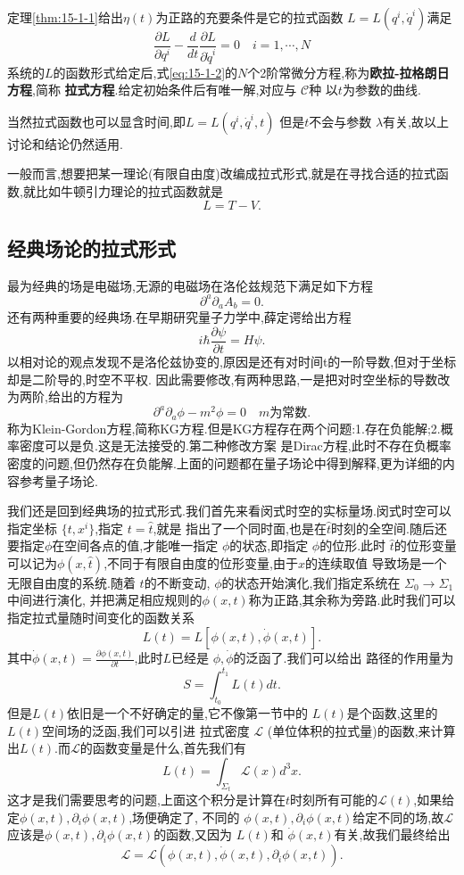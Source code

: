 \documentclass[../main.tex]{subfiles}
\begin{document}
定理\ref{thm:15-1-1}给出$\eta(t)$为正路的充要条件是它的拉式函数 $L = L(q^i,\dot{q}^i)$满足 
\begin{equation}
  \frac{\partial L}{ \partial q^i}  - \frac{d}{dt} \frac{\partial L}{\partial \dot{q}^i} = 0 \quad i = 1, \cdots , N
  \label{eq:15-1-2} 
\end{equation}
系统的$L$的函数形式给定后,式\ref{eq:15-1-2}的$N$个2阶常微分方程,称为\textbf{欧拉-拉格朗日方程},简称 \textbf{拉式方程}.给定初始条件后有唯一解,对应与 $\mathscr{C}$种
以$t$为参数的曲线.

当然拉式函数也可以显含时间,即$L= L(q^i,\dot{q}^i,t) $ 但是$t$不会与参数 $\lambda$有关,故以上讨论和结论仍然适用.

一般而言,想要把某一理论(有限自由度)改编成拉式形式,就是在寻找合适的拉式函数,就比如牛顿引力理论的拉式函数就是\[
L = T - V
.\] 
\subsection{经典场论的拉式形式}
最为经典的场是电磁场,无源的电磁场在洛伦兹规范下满足如下方程\[
\partial^a\partial_a A_b = 0
.\] 
还有两种重要的经典场.在早期研究量子力学中,薛定谔给出方程\[
i\hbar \frac{\partial \psi}{\partial t} = H \psi
.\] 
以相对论的观点发现不是洛伦兹协变的,原因是还有对时间t的一阶导数,但对于坐标却是二阶导的,时空不平权.
因此需要修改,有两种思路,一是把对时空坐标的导数改为两阶,给出的方程为\[
\partial^a\partial_a \phi - m^2 \phi = 0 \quad m\text{为常数}
.\] 
称为Klein-Gordon方程,简称KG方程.但是KG方程存在两个问题:1.存在负能解;2.概率密度可以是负.这是无法接受的.第二种修改方案
是Dirac方程,此时不存在负概率密度的问题,但仍然存在负能解.上面的问题都在量子场论中得到解释,更为详细的内容参考量子场论.

我们还是回到经典场的拉式形式.我们首先来看闵式时空的实标量场.闵式时空可以指定坐标 $\{t,x^i\}$,指定 $t = \hat{t}$,就是
指出了一个同时面,也是在$\hat{t}$时刻的全空间.随后还要指定$\phi$在空间各点的值,才能唯一指定 $\phi$的状态,即指定
 $\phi$的位形.此时 $\hat{t}$的位形变量可以记为$\phi(x,\hat{t})$,不同于有限自由度的位形变量,由于$x$的连续取值
 导致场是一个无限自由度的系统.随着 $t$的不断变动, $\phi$的状态开始演化,我们指定系统在 $\Sigma_0 \to \Sigma_1$中间进行演化,
 并把满足相应规则的$\phi(x,t)$称为正路,其余称为旁路.此时我们可以指定拉式量随时间变化的函数关系 \[
   L(t) = L[\phi(x,t),\dot{\phi}(x,t)]
 .\] 
 其中$\dot{\phi}(x,t) = \frac{\partial \phi(x,t)}{\partial t}$,此时$L$已经是 $\phi,\dot{\phi}$的泛函了.我们可以给出
 路径的作用量为 \[
   S = \int^{t_1}_{t_0} L(t)dt
 .\] 
 但是$L(t)$依旧是一个不好确定的量,它不像第一节中的 $L(t)$是个函数,这里的$L(t)$空间场的泛函,我们可以引进
 拉式密度 $\mathscr{L}$ (单位体积的拉式量)的函数,来计算出$L(t)$.而$\mathscr{L}$的函数变量是什么,首先我们有\[
   L(t) = \int_{\Sigma_t} \mathscr{L}(x) d^3x
 .\] 
 这才是我们需要思考的问题,上面这个积分是计算在$t$时刻所有可能的$\mathscr{L}(t)$,如果给定$\phi(x,t),\partial_i\phi(x,t)$,场便确定了,
 不同的 $\phi(x,t),\partial_i\phi(x,t)$给定不同的场,故$\mathscr{L}$应该是$\phi(x,t),\partial_i\phi(x,t)$的函数,又因为
 $L(t)$和 $\dot{\phi}(x,t)$有关,故我们最终给出 \[
 \mathscr{L} = \mathscr{L}(\phi(x,t),\dot{\phi}(x,t),\partial_i\phi(x,t))
 .\] 
\end{document}
